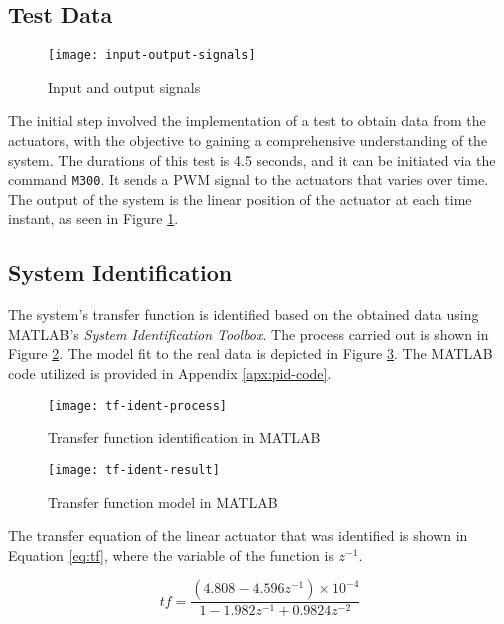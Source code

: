 \subsection{Test Data}

\begin{figure}[h]
    \centering
    \texttt{[image: input-output-signals]}
    \caption{Input and output signals}
    \label{fig:io-signals}
\end{figure}

The initial step involved the implementation of a test to obtain data from the actuators, with the objective to gaining a comprehensive understanding of the system. The durations of this test is 4.5 seconds, and it can be initiated via the command \texttt{M300}. It sends a PWM signal to the actuators that varies over time. The output of the system is the linear position of the actuator at each time instant, as seen in Figure \ref{fig:io-signals}.


\subsection{System Identification}

The system's transfer function is identified based on the obtained data using MATLAB's \textit{System Identification Toolbox}. The process carried out is shown in Figure \ref{fig:tf-indent-process}. The model fit to the real data is depicted in Figure \ref{fig:tf-result}. The MATLAB code utilized is provided in Appendix \ref{apx:pid-code}.

\begin{figure}[H]
    \centering
    \texttt{[image: tf-ident-process]}
    \caption{Transfer function identification in MATLAB}
    \label{fig:tf-indent-process}
\end{figure}

\begin{figure}[H]
    \centering
    \texttt{[image: tf-ident-result]}
    \caption{Transfer function model in MATLAB}
    \label{fig:tf-result}
\end{figure}

The transfer equation of the linear actuator that was identified is shown in Equation \ref{eq:tf}, where the variable of the function is \( z^{-1} \).

\begin{equation}
    \label{eq:tf}
    tf=\frac{(4.808-4.596z^{-1})\times10^{-4}}{1-1.982z^{-1}+0.9824z^{-2}}
\end{equation}



